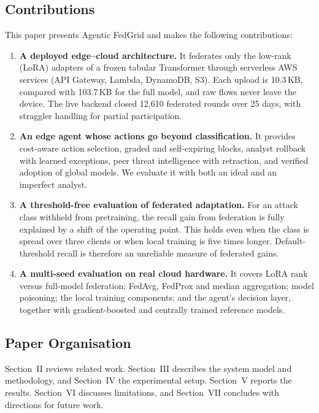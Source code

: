 \subsection{Contributions}
This paper presents Agentic FedGrid and makes the following contributions:
\begin{enumerate}
\item \textbf{A deployed edge--cloud architecture.} It federates only the
low-rank (LoRA) adapters of a frozen tabular Transformer through serverless
AWS services (API Gateway, Lambda, DynamoDB, S3). Each upload is 10.3\,KB,
compared with 103.7\,KB for the full model, and raw flows never leave the
device. The live backend closed 12{,}610 federated rounds over 25 days,
with straggler handling for partial participation.
\item \textbf{An edge agent whose actions go beyond classification.} It
provides cost-aware action selection, graded and self-expiring blocks,
analyst rollback with learned exceptions, peer threat intelligence with
retraction, and verified adoption of global models. We evaluate it with
both an ideal and an imperfect analyst.
\item \textbf{A threshold-free evaluation of federated adaptation.} For an
attack class withheld from pretraining, the recall gain from federation is
fully explained by a shift of the operating point. This holds even when the
class is spread over three clients or when local training is five times
longer. Default-threshold recall is therefore an unreliable measure of
federated gains.
\item \textbf{A multi-seed evaluation on real cloud hardware.} It covers
LoRA rank versus full-model federation; FedAvg, FedProx and median
aggregation; model poisoning; the local training components; and the agent's
decision layer, together with gradient-boosted and centrally trained
reference models.
\end{enumerate}

\subsection{Paper Organisation}
Section~II reviews related work. Section~III describes the system model and
methodology, and Section~IV the experimental setup. Section~V reports the
results. Section~VI discusses limitations, and Section~VII concludes with
directions for future work.
